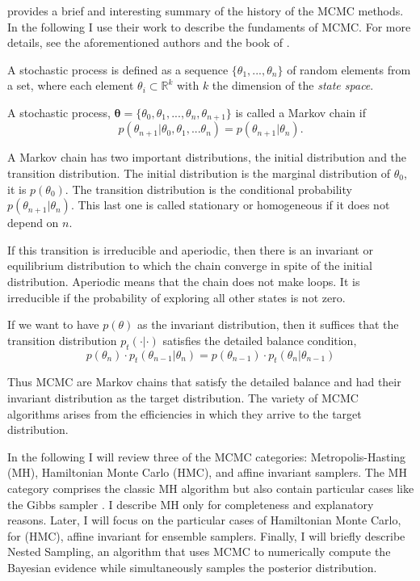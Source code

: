 \citet{Andrieu2003} provides a brief and interesting summary of the history of the MCMC methods. In the following I use their work to describe the fundaments of MCMC. For more details, see the aforementioned authors and the book of \citet{Brooks2011}.

A stochastic process is defined as a sequence  $\{\theta_1,...,\theta_n\}$ of random elements from a set, where each element $\theta_i \subset \mathbb{R}^k$  with $k$ the dimension of the \emph{state space}. 

A stochastic process, $\boldsymbol{\theta}=\{\theta_0,\theta_1,...,\theta_n,\theta_{n+1}\}$ is called a Markov chain if
\begin{equation}
p(\theta_{n+1} | \theta_0,\theta_1,...\theta_n) = p(\theta_{n+1} |\theta_n). \nonumber
\end{equation}

A Markov chain has two important distributions, the initial distribution and the transition distribution. The initial distribution is the marginal distribution of $\theta_0$, it is $p(\theta_0)$. The transition distribution is the conditional probability $p(\theta_{n+1} |\theta_n)$. This last one is called stationary or homogeneous if it does not depend on $n$.

If this transition is irreducible and aperiodic, then there is an invariant or equilibrium distribution to which the chain converge in spite of the initial distribution. Aperiodic means that the chain does not make loops. It is irreducible if the probability of exploring all other states is not zero.

If we want to have $p(\theta)$ as the invariant distribution, then it suffices that the transition distribution $p_t(\cdot | \cdot)$ satisfies the detailed balance condition,
\begin{equation}
p(\theta_{n})\cdot p_t(\theta_{n-1}|\theta_n)=p(\theta_{n-1})\cdot p_t(\theta_n | \theta_{n-1})
\end{equation}

Thus MCMC are Markov chains that satisfy the detailed balance and had their invariant distribution as the target distribution. 
The variety of MCMC algorithms arises from the efficiencies in which they arrive to the target distribution.

In the following I will review three of the MCMC categories: Metropolis-Hasting (MH), Hamiltonian Monte Carlo (HMC), and affine invariant samplers. The MH category comprises the classic MH algorithm but also contain particular cases like the Gibbs sampler \citep{Geman1984}. I describe MH only for completeness and explanatory reasons. Later, I will focus on the particular cases of Hamiltonian Monte Carlo, for (HMC), affine invariant for ensemble samplers. Finally, I will briefly describe Nested Sampling, an algorithm that uses MCMC to numerically compute the Bayesian evidence while simultaneously samples the posterior distribution. 
